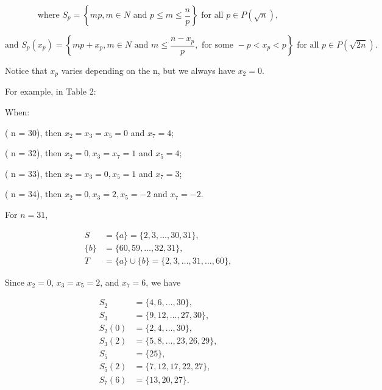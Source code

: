 \documentclass{aomart}
\begin{document}
\begin{equation}
\text{where } S_{p} = \left\{ mp, m \in N \text{ and } p \leq m \leq \frac{n}{p} \right\} \text{ for all } p \in P(\sqrt{n}),
\end{equation}

\begin{equation}
\text{and } S_{p}(x_{p}) = \left\{ mp+x_{p}, m \in N \text{ and } m \leq \frac{n-x_{p}}{p}, \text{ for some } -p < x_{p} < p \right\} \text{ for all } p \in P(\sqrt{2n}).
\end{equation}

\vspace{1\baselineskip}


Notice that \( x_{p}\) varies depending on the n, but we always have \( x_{2 } = 0\).
\vspace{1\baselineskip}

For example, in Table 2:
\vspace{1\baselineskip}
 
When:
\vspace{1\baselineskip}
\begin{center}
    

( n = 30), then \( x_{2 } = x_{3 } = x_{5 } = 0\) and \( x_{7 } = 4\);

( n = 32), then \( x_{2 } = 0,  x_{3 } = x_{7 } = 1\) and \( x_{5 } = 4\);

( n = 33), then \( x_{2 } = x_{3 } = 0,  x_{5 } = 1\) and \( x_{7 } = 3\);

( n = 34), then \( x_{2 } = 0,  x_{3 } = 2,  x_{5 } = -2\) and \( x_{7 } = -2.\)

\end{center}

 \vspace{1\baselineskip}

For \( n = 31 \),

\begin{align}
S &= \{ a \} = \{ 2,3,\ldots,30,31 \}, \\
\{ b \} &= \{ 60,59,\ldots,32,31 \}, \\
T &= \{ a \} \cup \{ b \} = \{ 2,3,\ldots,31,\ldots,60 \},
\end{align}

\vspace{1\baselineskip}

Since \( x_{2} = 0 \), \( x_{3} = x_{5} = 2 \), and \( x_{7} = 6 \), we have

\begin{align}
S_{2} &= \{ 4, 6, \ldots, 30 \}, \\
S_{3} &= \{ 9, 12, \ldots, 27, 30 \}, \\
S_{2}(0) &= \{ 2, 4, \ldots, 30 \}, \\
S_{3}(2) &= \{ 5, 8, \ldots, 23, 26, 29 \}, \\
S_{5} &= \{ 25 \}, \\
S_{5}(2) &= \{ 7, 12, 17, 22, 27 \}, \\
S_{7}(6) &= \{ 13, 20, 27 \}.
\end{align}
\end{document}
